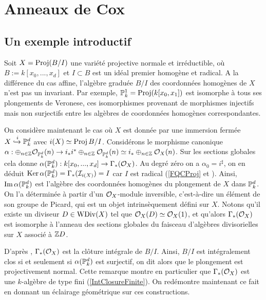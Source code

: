 \chapter{Anneaux de Cox}

\section{Un exemple introductif}
\label{ExIntroCox}
Soit $X=\operatorname{Proj}(B/I)$ une variété projective normale et irréductible, où $B:=k[x_0,...,x_d]$ et $I\subset B$ est un idéal premier homogène et radical. A la différence du cas affine, l'algèbre graduée $B/I$ des coordonnées homogènes de $X$ n'est pas un invariant. Par exemple, $\mathbb{P}^1_k=\operatorname{Proj}(k[x_0,x_1])$ est isomorphe à tous ses plongements de Veronese, ces isomorphismes provenant de morphismes injectifs mais non surjectifs entre les algèbres de coordonnées homogènes correspondantes.

On considère maintenant le cas où $X$ est donnée par une immersion fermée $X\xhookrightarrow{i}\mathbb{P}^d_k $ avec $i(X)\simeq \operatorname{Proj} B/I$. Considérons le morphisme canonique $\alpha: \oplus_{n\in\mathbb{Z}}\mathcal{O}_{\mathbb{P}^d_k}(n)\rightarrow i_*i^*\oplus_{n\in \mathbb{Z}}\mathcal{O}_{\mathbb{P}^d_k}(n)\simeq i_*\oplus_{n\in \mathbb{Z}}\mathcal{O}_X(n)$. Sur les sections globales cela donne $\alpha(\mathbb{P}^d_k): k[x_0,...,x_d]\rightarrow \Gamma_*(\mathcal{O}_X)$. Au degré zéro on a $\alpha_0=i^\sharp$, on en déduit $\operatorname{Ker} \alpha(\mathbb{P}^d_k)=\Gamma_*(\mathcal{I} _{i(X)})=I$ car $I$ est radical (\ref{FQCProj} et \cite[ex II.5.10]{Hartshorne}). Ainsi, $\operatorname{Im} \alpha(\mathbb{P}^d_k)$ est l'algèbre des coordonnées homogènes du plongement de $X$ dans $\mathbb{P}_k^d$. On l'a déterminée à partir d'un $\mathcal{O}_X$-module inversible, c'est-à-dire un élément de son groupe de Picard, qui est un objet intrinsèquement défini sur $X$. Notons qu'il existe un diviseur $D\in \operatorname{WDiv}(X)$ tel que $\mathcal{O}_X(D)\simeq\mathcal{O}_X(1)$, et qu'alors $\Gamma_*(\mathcal{O}_X)$ est isomorphe à l'anneau des sections globales du faisceau d'algèbres divisorielles sur $X$ associé à $\mathbb{Z} D$.

D'après \cite[ex II.5.14]{Hartshorne} , $\Gamma_*(\mathcal{O}_X)$ est la clôture intégrale de $B/I$. Ainsi, $B/I$ est intégralement clos si et seulement si $\alpha(\mathbb{P}^d_k)$ est surjectif, on dit alors que le plongement est projectivement normal. Cette remarque montre en particulier que $\Gamma_*(\mathcal{O}_X)$ est une $k$-algèbre de type fini (\ref{IntClosureFinite}). On redémontre maintenant ce fait en donnant un éclairage géométrique sur ces constructions. 

